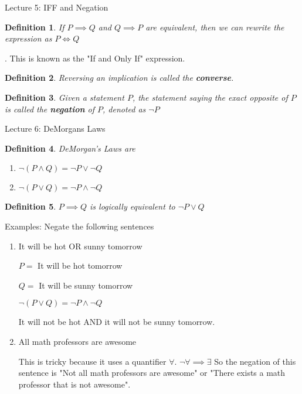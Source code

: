 \documentclass[11pt]{amsart}
\newtheorem{definition}{Definition}
\begin{document}
\begin{section}{Lecture 5: IFF and Negation}


\begin{definition} If $ P \implies Q$ and $Q \implies P$ are equivalent, then we can rewrite the expression as $ P \iff Q$ \end{definition}. This is known as the "If and Only If" expression.

\begin{definition}
	Reversing an implication is called the \textbf{converse}.
\end{definition}

\begin{definition}
	Given a statement $P$, the statement saying the exact opposite of $P$ is called the \textbf{negation} of $P$, denoted as $\neg P$
\end{definition}

\end{section}

\begin{section}{Lecture 6: DeMorgans Laws}

\begin{definition}
	DeMorgan's Laws are 
	
	\begin{enumerate}
		\item $ \neg \left(P \wedge Q \right) = \neg P \vee \neg Q $
		
		\item $ \neg \left( P \vee Q \right) = \neg P \wedge \neg Q $
	\end{enumerate}
\end{definition}

\begin{definition}
	$ P \implies Q$ is logically equivalent to $ \neg P \vee Q $
\end{definition}


Examples: Negate the following sentences

\begin{enumerate}
	\item It will be hot OR sunny tomorrow
	
	$ P = $ It will be hot tomorrow
	
	$ Q = $ It will be sunny tomorrow
	
	$ \neg \left( P \vee Q \right) = \neg P \wedge \neg Q $
	
	It will not be hot AND it will not be sunny tomorrow.
	
	\item All math professors are awesome
	
	This is tricky because it uses a quantifier $\forall $. $\neg \forall \implies \exists$ So the negation of this sentence is "Not all math professors are awesome" or "There exists a math professor that is not awesome".
\end{enumerate}
\end{section}
\end{document}
